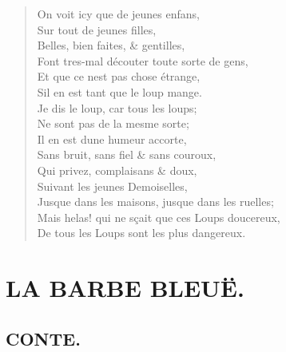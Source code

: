 \documentclass[14pt,a4paper]{memoir}
\begin{document}
\begin{otherlanguage}{french}
\begin{verse}
  \small
On voit icy que de jeunes enfans, \\
Sur tout de jeunes filles, \\
Belles, bien faites, \& gentilles, \\
Font tres-mal d\textquotesingle écouter toute sorte de gens, \\
Et que ce n\textquotesingle est pas chose étrange, \\
S\textquotesingle il en est tant que le loup mange. \\
Je dis le loup, car tous les loups; \\
Ne sont pas de la mesme sorte; \\
Il en est d\textquotesingle une humeur accorte, \\
Sans bruit, sans fiel \& sans couroux, \\
Qui privez, complaisans \& doux, \\
Suivant les jeunes Demoiselles, \\
Jusque dans les maisons, jusque dans les ruelles;  \\
Mais helas! qui ne sçait que ces Loups doucereux,  \\
De tous les Loups sont les plus dangereux.
\end{verse}


\chapter{LA BARBE BLEUË.}

\section{CONTE.}


\end{otherlanguage}
\end{document}
